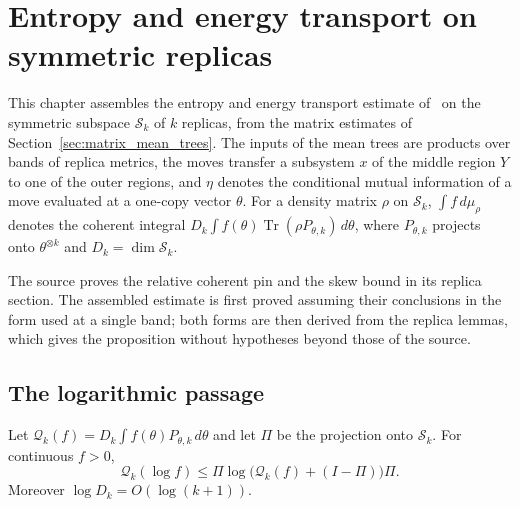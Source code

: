 
\chapter{Entropy and energy transport on symmetric replicas}
\label{ch:replica_transport}

This chapter assembles the entropy and energy transport estimate
of~\cite[Proposition~7.4]{OpenAI2026AreaLaw} on the symmetric subspace
$\mathcal S_k$ of $k$ replicas, from the matrix estimates of
Section~\ref{sec:matrix_mean_trees}. The inputs of the mean trees are products
over bands of replica metrics, the moves transfer a subsystem $x$ of the middle
region $Y$ to one of the outer regions, and $\eta$ denotes the conditional mutual
information of a move evaluated at a one-copy vector $\theta$. For a density
matrix $\rho$ on $\mathcal S_k$, $\int f\,d\mu_\rho$ denotes the coherent
integral $D_k\int f(\theta)\operatorname{Tr}(\rho P_{\theta,k})\,d\theta$, where
$P_{\theta,k}$ projects onto $\theta^{\otimes k}$ and $D_k=\dim\mathcal S_k$.

The source proves the relative coherent pin and the skew bound in its replica
section. The assembled estimate is first proved assuming their conclusions in the
form used at a single band; both forms are then derived from the replica lemmas,
which gives the proposition without hypotheses beyond those of the source.



\section{The logarithmic passage}

\begin{lemma}
    \label{lem:replica_coherent_log_jensen}
    \leanok
    Let $\mathcal Q_k(f)=D_k\int f(\theta)P_{\theta,k}\,d\theta$ and let $\Pi$ be
    the projection onto $\mathcal S_k$. For continuous $f>0$,
    \[
      \mathcal Q_k(\log f)\le\Pi\log\bigl(\mathcal Q_k(f)+(I-\Pi)\bigr)\Pi .
    \]
    Moreover $\log D_k=O(\log(k+1))$.
\end{lemma}

